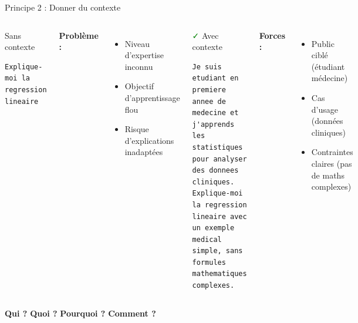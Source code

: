 \begin{frame}[fragile]{Principe 2 : Donner du contexte}
\begin{columns}
\begin{alertblock}{\textcolor{red}{\faTimes} Sans contexte}
\begin{lstlisting}[basicstyle=\ttfamily\tiny]
Explique-moi la regression 
lineaire
\end{lstlisting}
\end{alertblock}

{\footnotesize

\textbf{Problème :}
\begin{itemize}
    \item Niveau d'expertise inconnu
    \item Objectif d'apprentissage flou
    \item Risque d'explications inadaptées
\end{itemize}
}

\begin{exampleblock}{\textcolor{green}{\faCheck} Avec contexte}
\begin{lstlisting}[basicstyle=\ttfamily\tiny]
Je suis etudiant en premiere 
annee de medecine et j'apprends 
les statistiques pour analyser 
des donnees cliniques. 
Explique-moi la regression 
lineaire avec un exemple medical 
simple, sans formules mathematiques 
complexes.
\end{lstlisting}
\end{exampleblock}

{\footnotesize

\textbf{Forces :}
\begin{itemize}
    \item Public ciblé (étudiant médecine)
    \item Cas d'usage (données cliniques)
    \item Contraintes claires (pas de maths complexes)
\end{itemize}
}

\end{columns}

\vspace{0.3cm}

{\footnotesize
\begin{center}
    \textbf{Qui ?} \textbf{Quoi ?} \textbf{Pourquoi ?} \textbf{Comment ?}
\end{center}
}
\end{frame}

